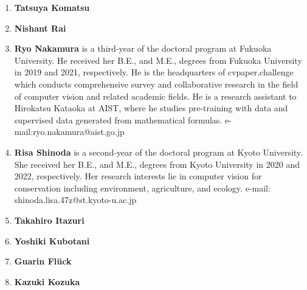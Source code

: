 \documentclass{article}
\newcommand{\cYoshi}[1]{{\color{cyan}{#1}}} %
\begin{document}
\begin{enumerate}
    \item {\bf Tatsuya Komatsu} \cYoshi{Please write here by yourself.}

    \item {\bf Nishant Rai} \cYoshi{Please write here by yourself.}

    \item {\bf Ryo Nakamura} is a third-year of the doctoral program at Fukuoka University. He received her B.E., and M.E., degrees from Fukuoka University in 2019 and 2021, respectively. He is the headquarters of cvpaper.challenge which conducts comprehensive survey and collaborative research in the field of computer vision and related academic fields. He is a research assistant to Hirokatsu Kataoka at AIST, where he studies pre-training with data and supervised data generated from mathematical formulas. e-mail:ryo.nakamura@aist.go.jp

    \item {\bf Risa Shinoda} is a second-year of the doctoral program at Kyoto University. She received her B.E., and M.E., degrees from Kyoto University in 2020 and 2022, respectively. Her research interests lie in computer vision for conservation including environment, agriculture, and ecology. e-mail: shinoda.lisa.47z@st.kyoto-u.ac.jp

    \item {\bf Takahiro Itazuri} \cYoshi{Please write here by yourself.}

    \item {\bf Yoshiki Kubotani} \cYoshi{Please write here by yourself.}

    \item {\bf Guarin Flück} \cYoshi{Please write here by yourself.}

    \item {\bf Kazuki Kozuka} \cYoshi{Please write here by yourself.}



\end{enumerate}
\end{document}
